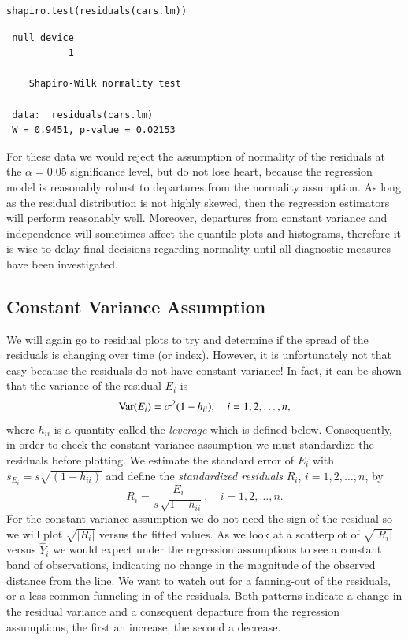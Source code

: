\documentclass[captions=tableheading]{scrbook}
\begin{document}
\begin{verbatim}
shapiro.test(residuals(cars.lm))
\end{verbatim}

\begin{verbatim}
 null device 
           1
  
 	Shapiro-Wilk normality test
 
 data:  residuals(cars.lm) 
 W = 0.9451, p-value = 0.02153
\end{verbatim}

For these data we would reject the assumption of normality of the residuals at the \(\alpha=0.05\) significance level, but do not lose heart, because the regression model is reasonably robust to departures from the normality assumption. As long as the residual distribution is not highly skewed, then the regression estimators will perform reasonably well. Moreover, departures from constant variance and independence will sometimes affect the quantile plots and histograms, therefore it is wise to delay final decisions regarding normality until all diagnostic measures have been investigated.
\subsection{Constant Variance Assumption}
\label{sec-1-4-2}

\label{sub:Constant-Variance-Assumption}

We will again go to residual plots to try and determine if the spread of the residuals is changing over time (or index). However, it is unfortunately not that easy because the residuals do not have constant variance! In fact, it can be shown that the variance of the residual \(E_{i}\) is 
\begin{equation}
\mbox{Var\ensuremath{(E_{i})}}=\sigma^{2}(1-h_{ii}),\quad i=1,2,\ldots,n,
\end{equation}
where \(h_{ii}\) is a quantity called the \emph{leverage} which is defined below. Consequently, in order to check the constant variance assumption we must standardize the residuals before plotting. We estimate the standard error of \(E_{i}\) with \(s_{E_{i}}=s\sqrt{(1-h_{ii})}\) and define the \emph{standardized residuals} \(R_{i}\), \(i=1,2,\ldots,n\), by 
\begin{equation} 
R_{i}=\frac{E_{i}}{s\,\sqrt{1-h_{ii}}},\quad i=1,2,\ldots,n.
\end{equation}
For the constant variance assumption we do not need the sign of the residual so we will plot \(\sqrt{|R_{i}|}\) versus the fitted values. As we look at a scatterplot of \(\sqrt{|R_{i}|}\) versus \(\hat{Y}_{i}\) we would expect under the regression assumptions to see a constant band of observations, indicating no change in the magnitude of the observed distance from the line. We want to watch out for a fanning-out of the residuals, or a less common funneling-in of the residuals. Both patterns indicate a change in the residual variance and a consequent departure from the regression assumptions, the first an increase, the second a decrease.
\end{document}
